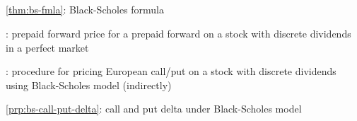 \subsection*{}
\item \cref{thm:bs-fmla}: Black-Scholes formula
\item {}: prepaid forward price for a prepaid forward on a stock with discrete dividends in a perfect market
\item {}: procedure for pricing European call/put on a stock with discrete dividends using Black-Scholes model (indirectly)
\item \cref{prp:bs-call-put-delta}: call and put delta under Black-Scholes model

